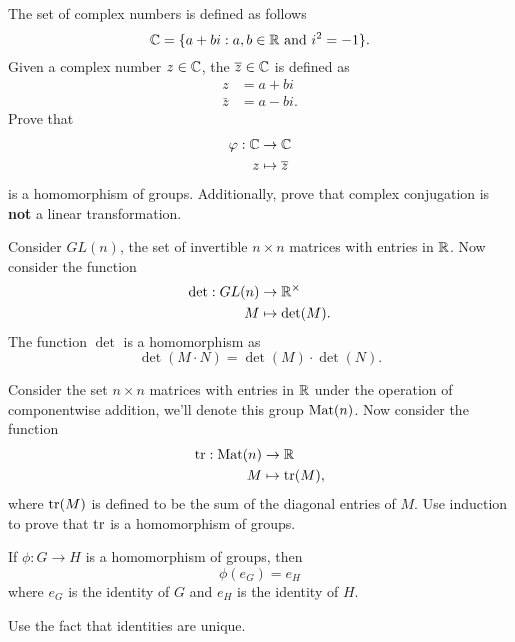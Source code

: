 \documentclass{ximera}
\begin{document}
\begin{exercise}
  The set of complex numbers is defined as follows
  \[
  \mathbb C = \{ a + b i: \text{$a,b\in\mathbb R$ and $i^2 = -1$}\}.
  \]
  Given a complex number $z\in\mathbb C$, the 
  $\overline{z}\in\mathbb C$ is defined as
  \begin{align*}
    z &= a+bi\\
    \bar{z} &= a- bi.
  \end{align*}
  Prove that
  \begin{align*}
    \varphi:\mathbb C &\to\mathbb C\\
    z &\mapsto \overline{z}
  \end{align*}
  is a homomorphism of groups.  Additionally, prove that complex
  conjugation is \textbf{not} a linear transformation.
\end{exercise}




\begin{example}[Determinants]\label{EG:det}
  Consider $GL(n)$, the set of invertible $n\times n$ matrices with
  entries in $\mathbb R$. Now consider the function
  \begin{align*}
    \det: GL(n) &\to \mathbb R^\times \\
             M  &\mapsto  \det(M).
  \end{align*}
  The function $\det$ is a homomorphism as
  \[
  \det(M \cdot N) = \det(M) \cdot \det(N).
  \]
\end{example}


\begin{exercise}
  Consider the set $n\times n$ matrices with entries in $\mathbb R$ under the
  operation of componentwise addition, we'll denote this group $\operatorname{Mat}(n)$. Now consider the function
  \begin{align*}
    \operatorname{tr}:\operatorname{Mat}(n) &\to \mathbb R\\
    M &\mapsto \operatorname{tr}(M),
  \end{align*}
  where $\operatorname{tr}(M)$ is defined to be the sum of the diagonal entries of
  $M$. Use induction to prove that $\operatorname{tr}$ is a homomorphism of groups.
\end{exercise}


\begin{lemma}\label{L:HPId}
  If $\phi:G\to H$ is a homomorphism of groups, then
  \[
  \phi(e_G) = e_H
  \]
  where $e_G$ is the identity of $G$ and $e_H$ is the identity of
  $H$.
  \begin{sketch}
    Use the fact that identities are unique.
  \end{sketch}
\end{lemma}
\end{document}

